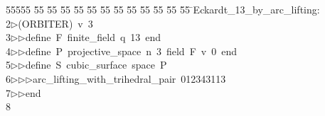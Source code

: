 %
%
\begin{tabbing}
55555 \= 55 \= 55 \= 55 \= 55 \= 55 \= 55 \= 55 \= 55 \= 55 \= 55 \= 55 \= 55 \= \>Eckardt\_13\_by\_arc\_lifting:\\[0pt]
2\>$\triangleright$\>(ORBITER)\ v\ 3\ \\[0pt]
3\>$\triangleright$\>$\triangleright$\>define\ F\ finite\_field\ q\ 13\ end\ \\[0pt]
4\>$\triangleright$\>$\triangleright$\>define\ P\ projective\_space\ n\ 3\ field\ F\ v\ 0\ end\ \\[0pt]
5\>$\triangleright$\>$\triangleright$\>define\ S\ cubic\_surface\ space\ P\ \\[0pt]
6\>$\triangleright$\>$\triangleright$\>$\triangleright$\>arc\_lifting\_with\_trihedral\_pair\ 012343113\ \\[0pt]
7\>$\triangleright$\>$\triangleright$\>end\\[0pt]
8\>\end{tabbing}

